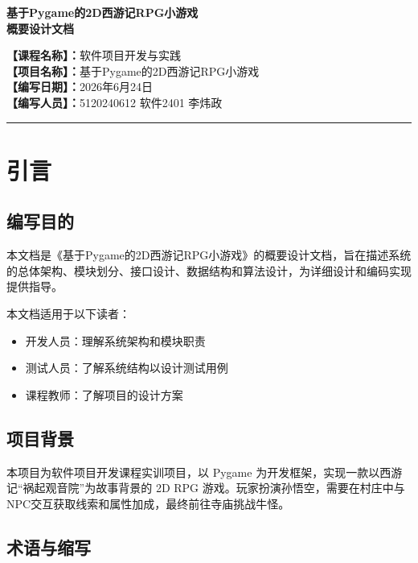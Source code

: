 \documentclass[12pt,a4paper]{article}
\begin{document}
\begin{center}
    {\LARGE\bfseries 基于Pygame的2D西游记RPG小游戏\\[0.3cm]概要设计文档}\\[1cm]
\end{center}

\noindent
\textbf{【课程名称】：}软件项目开发与实践\\[6pt]
\textbf{【项目名称】：}基于Pygame的2D西游记RPG小游戏\\[6pt]
\textbf{【编写日期】：}2026年6月24日\\[6pt]
\textbf{【编写人员】：}5120240612 软件2401 李炜政\\[12pt]

\rule{\textwidth}{0.8pt}

\section{引言}

\subsection{编写目的}

本文档是《基于Pygame的2D西游记RPG小游戏》的概要设计文档，旨在描述系统的总体架构、模块划分、接口设计、数据结构和算法设计，为详细设计和编码实现提供指导。

本文档适用于以下读者：
\begin{itemize}
    \item 开发人员：理解系统架构和模块职责
    \item 测试人员：了解系统结构以设计测试用例
    \item 课程教师：了解项目的设计方案
\end{itemize}

\subsection{项目背景}

本项目为软件项目开发课程实训项目，以 Pygame 为开发框架，实现一款以西游记“祸起观音院”为故事背景的 2D RPG 游戏。玩家扮演孙悟空，需要在村庄中与NPC交互获取线索和属性加成，最终前往寺庙挑战牛怪。

\subsection{术语与缩写}
\end{document}
